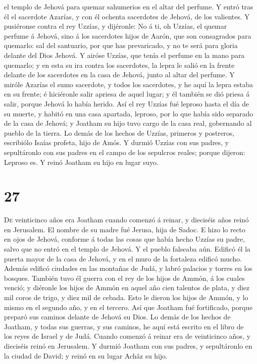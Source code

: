 el templo de Jehová para quemar sahumerios en el altar del perfume.
 Y entró tras él el sacerdote Azarías, y con él ochenta
sacerdotes de Jehová, de los valientes.  Y pusiéronse
contra el rey Uzzías, y dijéronle: No á ti, oh Uzzías, el quemar perfume
á Jehová, sino á los sacerdotes hijos de Aarón, que son consagrados para
quemarlo: sal del santuario, por que has prevaricado, y no te será para
gloria delante del Dios Jehová.  Y airóse Uzzías, que
tenía el perfume en la mano para quemarlo; y en esta su ira contra los
sacerdotes, la lepra le salió en la frente delante de los sacerdotes en
la casa de Jehová, junto al altar del perfume.  Y miróle
Azarías el sumo sacerdote, y todos los sacerdotes, y he aquí la lepra
estaba en su frente; é hiciéronle salir apriesa de aquel lugar; y él
también se dió priesa á salir, porque Jehová lo había herido.
 Así el rey Uzzías fué leproso hasta el día de su muerte,
y habitó en una casa apartada, leproso, por lo que había sido separado
de la casa de Jehová; y Joatham su hijo tuvo cargo de la casa real,
gobernando al pueblo de la tierra.  Lo demás de los
hechos de Uzzías, primeros y postreros, escribiólo Isaías profeta, hijo
de Amós.  Y durmió Uzzías con sus padres, y sepultáronlo
con sus padres en el campo de los sepulcros reales; porque dijeron:
Leproso es. Y reinó Joatham su hijo en lugar suyo.

\hypertarget{section-26}{%
\section{27}\label{section-26}}

 \textsc{De} veinticinco años era Joatham cuando comenzó á
reinar, y dieciséis años reinó en Jerusalem. El nombre de su madre fué
Jerusa, hija de Sadoc.  E hizo lo recto en ojos de Jehová,
conforme á todas las cosas que había hecho Uzzías su padre, salvo que no
entró en el templo de Jehová. Y el pueblo falseaba aún. 
Edificó él la puerta mayor de la casa de Jehová, y en el muro de la
fortaleza edificó mucho.  Además edificó ciudades en las
montañas de Judá, y labró palacios y torres en los bosques.
 También tuvo él guerra con el rey de los hijos de Ammón,
á los cuales venció; y diéronle los hijos de Ammón en aquel año cien
talentos de plata, y diez mil coros de trigo, y diez mil de cebada. Esto
le dieron los hijos de Ammón, y lo mismo en el segundo año, y en el
tercero.  Así que Joatham fué fortificado, porque preparó
sus caminos delante de Jehová su Dios.  Lo demás de los
hechos de Joatham, y todas sus guerras, y sus caminos, he aquí está
escrito en el libro de los reyes de Israel y de Judá. 
Cuando comenzó á reinar era de veinticinco años, y dieciséis reinó en
Jerusalem.  Y durmió Joatham con sus padres, y
sepultáronlo en la ciudad de David; y reinó en su lugar Achâz su hijo.

